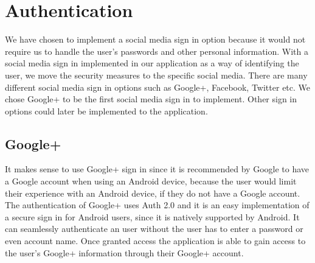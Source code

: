 \section{Authentication}
We have chosen to implement a social media sign in option because it would not require us to handle the user's passwords and other personal information. With a social media sign in implemented in our application as a way of identifying the user, we move the security measures to the specific social media.
There are many different social media sign in options such as Google+, Facebook, Twitter etc. We chose Google+ to be the first social media sign in to implement. Other sign in options could later be implemented to the application.

\subsection{Google+}
It makes sense to use Google+ sign in since it is recommended by Google to have a Google account when using an Android device, because the user would limit their experience with an Android device, if they do not have a Google account. 
The authentication of Google+ uses Auth 2.0 and it is an easy implementation of a secure sign in for Android users, since it is natively supported by Android. 
It can seamlessly authenticate an user without the user has to enter a password or even account name. 
Once granted access the application is able to gain access to the user's Google+ information through their Google+ account.\cite{googleplusvideo}


